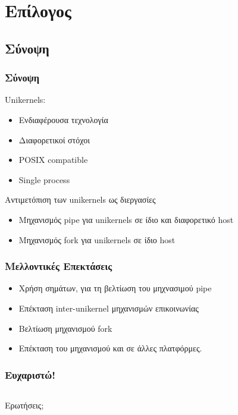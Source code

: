 \documentclass[red,slidestop,notes,compress,mathserif]{beamer}
\begin{document}
\section*{Επίλογος}

\subsection*{Σύνοψη}

\begin{frame}
\frametitle{Σύνοψη}
Unikernels:
\begin{itemize}
\item Ενδιαφέρουσα τεχνολογία
\item Διαφορετικοί στόχοι 
\item POSIX compatible
\item Single process
\end{itemize}
\begin{block}{Αντιμετόπιση των unikernels ως διεργασίες}
\begin{itemize}
\item Μηχανισμός pipe για unikernels σε ίδιο και διαφορετικό host
\item Μηχανισμός fork για unikernels σε ίδιο host
\end{itemize}
\end{block}
\end{frame}

\begin{frame}
\frametitle{Μελλοντικές Επεκτάσεις}
\begin{itemize}
\item Χρήση σημάτων, για τη βελτίωση του μηχνασιμού pipe
\item Επέκταση inter-unikernel μηχανισμών επικοινωνίας 
\item Βελτίωση μηχανισμού fork
\item Επέκταση του μηχανισμού και σε άλλες πλατφόρμες.
\end{itemize}

\end{frame}
%
\begin{frame}
\frametitle{Ευχαριστώ!}
                \vfill%
\begin{columns}
        \begin{center}
        \begin{center}
                        {\LARGE Ερωτήσεις;}
        \end{center}
                \vfill%
        \end{center}
\end{columns}
                \vfill%
\end{frame}
\end{document}
